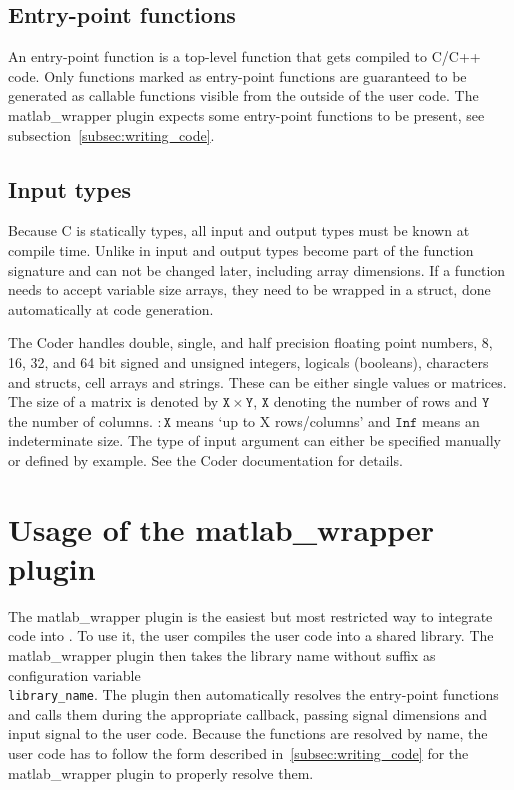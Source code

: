 \documentclass[11pt,a4paper,twoside]{article}
\newcommand{\+}{\discretionary{\mbox{\scriptsize$\hookleftarrow$}}{}{}}
\begin{document}
\subsection*{Entry-point functions}
An entry-point function is a top-level \Matlab{} function that gets compiled to
C/C++ code. Only functions marked as entry-point functions are guaranteed to be
generated as callable functions visible from the outside of the user code. The
matlab\_wrapper plugin expects some entry-point functions to be present, see
subsection~\ref{subsec:writing_code}.

\subsection*{Input types}
Because C is statically types, all input and output types must be known at
compile time. Unlike in \Matlab{} input and output types become part of the
function signature and can not be changed later, including array dimensions.
If a function needs to accept variable size arrays, they need to be wrapped
in a struct, done automatically at code generation.

The \Matlab{} Coder handles double, single, and half precision floating point
numbers, 8, 16, 32, and 64 bit signed and unsigned integers, logicals
(booleans), characters and structs, cell arrays and strings. These can be either single values or
matrices. The size of a matrix is denoted by $\mathtt{\!X} \times \mathtt{\!Y}$, $\mathtt{\!X}$ denoting the number
of rows and $\mathtt{\!Y}$ the number of columns. $\mathtt{:\!X}$ means `up to X rows/columns' and $\mathtt{Inf}$
means an indeterminate size. The type of input argument can either be specified
manually or defined by example. See the \Matlab{} Coder documentation for
details.

\section{Usage of the matlab\_wrapper plugin}\label{sec:wrapper plugin}

The matlab\_wrapper plugin is the easiest but most restricted way to integrate
\Matlab{} code into \mha{}. To use it, the user compiles the user code into a
shared library. The matlab\_wrapper plugin then takes the library name without
suffix as configuration variable\\ \texttt{library\_name}. The plugin then automatically
resolves the entry-point functions and calls them during the appropriate
callback, passing signal dimensions and input signal to the user code. Because
the functions are resolved by name, the user code has to follow the form
described in~\ref{subsec:writing_code} for the matlab\_wrapper plugin to
properly resolve them.
\end{document}
